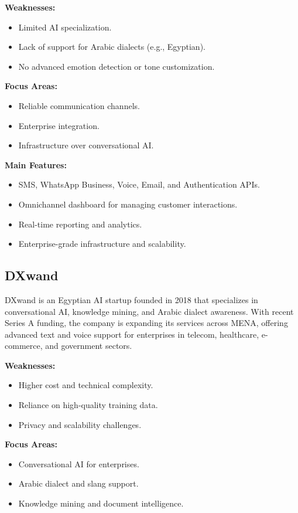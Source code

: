 \documentclass[20pt,a4paper]{article}
\begin{document}
\textbf{Weaknesses:}
\begin{itemize}
    \item Limited AI specialization.
    \item Lack of support for Arabic dialects (e.g., Egyptian).
    \item No advanced emotion detection or tone customization.
\end{itemize}

\textbf{Focus Areas:}
\begin{itemize}
    \item Reliable communication channels.
    \item Enterprise integration.
    \item Infrastructure over conversational AI.
\end{itemize}
\textbf{Main Features:}
\begin{itemize}
    \item SMS, WhatsApp Business, Voice, Email, and Authentication APIs.
    \item Omnichannel dashboard for managing customer interactions.
    \item Real-time reporting and analytics.
    \item Enterprise-grade infrastructure and scalability.
\end{itemize}

\subsection*{DXwand}

DXwand is an Egyptian AI startup founded in 2018 that specializes in conversational AI, 
knowledge mining, and Arabic dialect awareness. With recent Series A funding, the 
company is expanding its services across MENA, offering advanced text and voice 
support for enterprises in telecom, healthcare, e-commerce, and government sectors.

\textbf{Weaknesses:}
\begin{itemize}
    \item Higher cost and technical complexity.
    \item Reliance on high-quality training data.
    \item Privacy and scalability challenges.
\end{itemize}

\textbf{Focus Areas:}
\begin{itemize}
    \item Conversational AI for enterprises.
    \item Arabic dialect and slang support.
    \item Knowledge mining and document intelligence.
\end{itemize}
\end{document}
